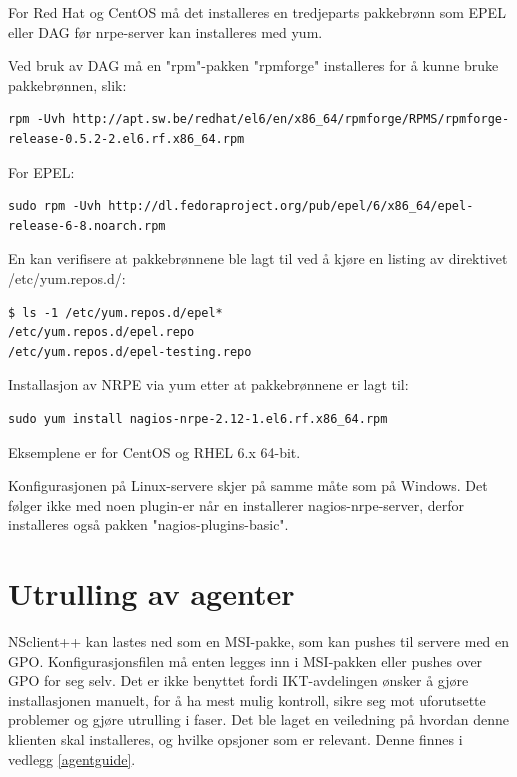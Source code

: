 For Red Hat og CentOS må det installeres en tredjeparts pakkebrønn som EPEL eller DAG før nrpe-server kan installeres med yum.

Ved bruk av DAG må en "rpm"-pakken "rpmforge" installeres for å kunne bruke pakkebrønnen, slik:

\begin{lstlisting}
rpm -Uvh http://apt.sw.be/redhat/el6/en/x86_64/rpmforge/RPMS/rpmforge-release-0.5.2-2.el6.rf.x86_64.rpm
\end{lstlisting}

For EPEL:

\begin{lstlisting}
sudo rpm -Uvh http://dl.fedoraproject.org/pub/epel/6/x86_64/epel-release-6-8.noarch.rpm
\end{lstlisting}

En kan verifisere at pakkebrønnene ble lagt til ved å kjøre en listing av direktivet /etc/yum.repos.d/:

\begin{lstlisting}
$ ls -1 /etc/yum.repos.d/epel*
/etc/yum.repos.d/epel.repo
/etc/yum.repos.d/epel-testing.repo
\end{lstlisting}

Installasjon av NRPE via yum etter at pakkebrønnene er lagt til:

\begin{lstlisting}
sudo yum install nagios-nrpe-2.12-1.el6.rf.x86_64.rpm 
\end{lstlisting}

Eksemplene er for CentOS og RHEL 6.x 64-bit.

Konfigurasjonen på Linux-servere skjer på samme måte som på Windows. Det følger ikke med noen plugin-er når en installerer nagios-nrpe-server, derfor installeres også pakken "nagios-plugins-basic".

\section{Utrulling av agenter}
NSclient++ kan lastes ned som en MSI-pakke, som kan pushes til servere med en GPO. Konfigurasjonsfilen må enten legges inn i MSI-pakken eller pushes over GPO for seg selv. Det er ikke benyttet fordi IKT-avdelingen ønsker å gjøre installasjonen manuelt, for å ha mest mulig kontroll, sikre seg mot uforutsette problemer og gjøre utrulling i faser. Det ble laget en veiledning på hvordan denne klienten skal installeres, og hvilke opsjoner som er relevant. Denne finnes i vedlegg \ref{agentguide}.

